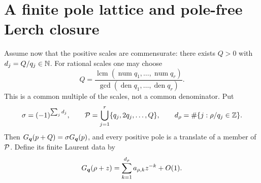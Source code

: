 \section{A finite pole lattice and pole-free Lerch closure}
\label{clc:sec:lattice}

Assume now that the positive scales are commensurate: there exists $Q>0$
with $d_j=Q/q_j\in\mathbb N$. For rational scales one may choose
\begin{equation}\label{clc:eq:Q}
 Q=\frac{\operatorname{lcm}(\operatorname{num}q_1,\ldots,
                              \operatorname{num}q_r)}
         {\gcd(\operatorname{den}q_1,\ldots,
                              \operatorname{den}q_r)}.
\end{equation}
This is a common multiple of the scales, not a common denominator.
Put
\begin{equation}\label{clc:eq:period-data}
 \sigma=(-1)^{\sum_jd_j},\qquad
 \mathcal P=\bigcup_{j=1}^r\{q_j,2q_j,\ldots,Q\},\qquad
 d_\rho=\#\{j:\rho/q_j\in\mathbb Z\}.
\end{equation}
Then $G_{\boldsymbol q}(p+Q)=\sigma G_{\boldsymbol q}(p)$, and every positive pole is a
translate of a member of $\mathcal P$. Define its finite Laurent data by
\begin{equation}\label{clc:eq:Laurent}
 G_{\boldsymbol q}(\rho+z)=\sum_{k=1}^{d_\rho}a_{\rho,k}z^{-k}+O(1).
\end{equation}

